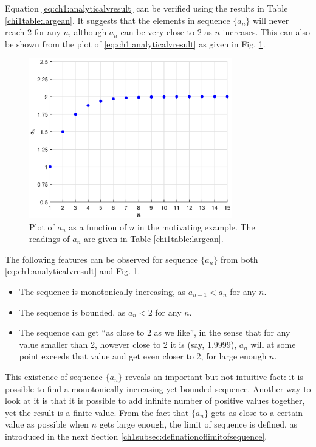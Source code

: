 Equation \eqref{eq:ch1:analyticalvresult} can be verified using the results in Table \ref{chi1table:largean}. It suggests that the elements in sequence $\{a_n\}$ will never reach 2 for any $n$, although $a_n$ can be very close to $2$ as $n$ increases. This can also be shown from the plot of \eqref{eq:ch1:analyticalvresult} as given in Fig. \ref{ch1fig:motivatingexp}.
\begin{figure}
\centering
\includegraphics[width=250pt]{chapters/part-1/figures/fig_motivatingexp.eps}
\caption{Plot of $a_n$ as a function of $n$ in the motivating example. The readings of $a_n$ are given in Table \ref{chi1table:largean}.} \label{ch1fig:motivatingexp}
\end{figure}

The following features can be observed for sequence $\{a_n\}$ from both \eqref{eq:ch1:analyticalvresult} and Fig. \ref{ch1fig:motivatingexp}.
\begin{itemize}
  \item The sequence is monotonically increasing, as $a_{n-1}<a_n$ for any $n$.
  \item The sequence is bounded, as $a_n<2$ for any $n$.
  \item The sequence can get ``as close to $2$ as we like'', in the sense that for any value smaller than 2, however close to 2 it is (say, 1.9999), $a_n$ will at some point exceeds that value and get even closer to 2, for large enough $n$.
\end{itemize}

This existence of sequence $\{a_n\}$ reveals an important but not intuitive fact: it is possible to find a monotonically increasing yet bounded sequence. Another way to look at it is that it is possible to add infinite number of positive values together, yet the result is a finite value. From the fact that $\{a_n\}$ gets as close to a certain value as possible when $n$ gets large enough, the limit of sequence is defined, as introduced in the next Section \ref{ch1subsec:definationoflimitofsequence}.

